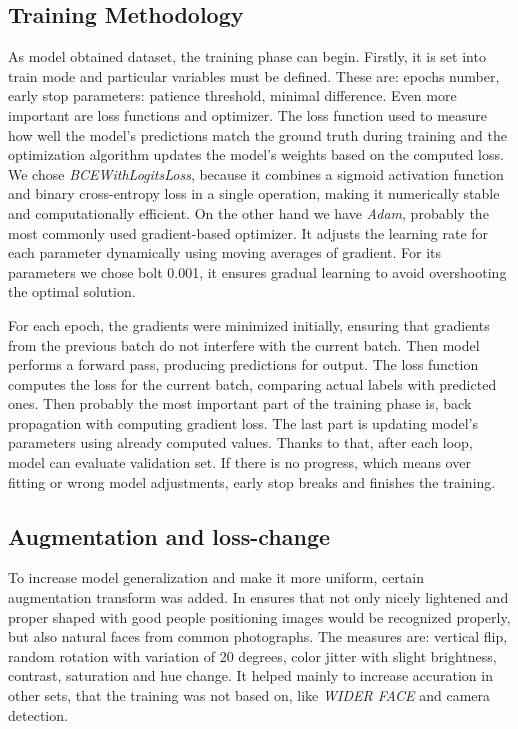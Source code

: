 \documentclass{article}
\begin{document}
\subsection{Training Methodology}

    As model obtained dataset, the training phase can begin. Firstly, it is set into train mode and particular variables must be defined. These are: epochs number, early stop parameters: patience threshold, minimal difference. Even more important are loss functions and optimizer. The loss function used to measure how well the model's predictions match the ground truth during training and the optimization algorithm updates the model's weights based on the computed loss.
    We chose {\textit{BCEWithLogitsLoss}}, because it combines a sigmoid activation function and binary cross-entropy loss in a single operation, making it numerically stable and computationally efficient. On the other hand we have {\textit{Adam}}, probably the most commonly used gradient-based optimizer. It adjusts the learning rate for each parameter dynamically using moving averages of gradient. For its parameters we chose bolt 0.001, it ensures gradual learning to avoid overshooting the optimal solution.

\vspace{0.2cm}
    For each epoch, the gradients were minimized initially, ensuring that gradients from the previous batch do not interfere with the current batch. Then model performs a forward pass, producing predictions for output. The loss function computes the loss for the current batch, comparing actual labels with predicted ones. Then probably the most important part of the training phase is, back propagation with computing gradient loss. The last part is updating model's parameters using already computed values. Thanks to that, after each loop, model can evaluate validation set. If there is no progress, which means over fitting or wrong model adjustments, early stop breaks and finishes the training.

\subsection{Augmentation and loss-change}
    To increase model generalization and make it more uniform, certain augmentation transform was added. In ensures that not only nicely lightened and proper shaped with good people positioning images would be recognized properly, but also natural faces from common photographs. The measures are: vertical flip, random rotation with variation of 20 degrees, color jitter with slight brightness, contrast, saturation and hue change. It helped mainly to increase accuration in other sets, that the training was not based on, like {\textit{WIDER FACE}} and camera detection.
\end{document}
